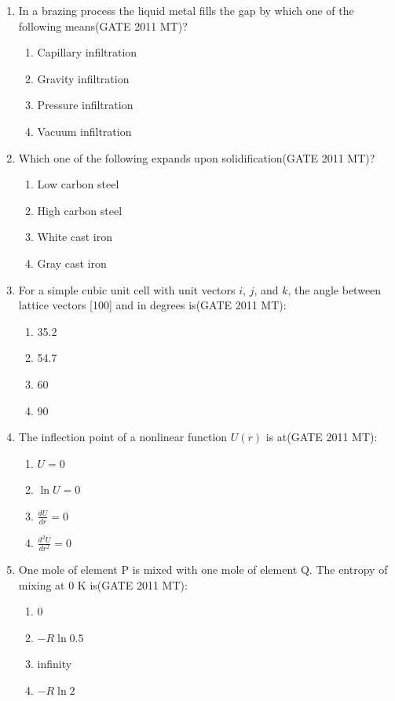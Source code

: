 \documentclass[12pt]{article}
\begin{document}
\begin{enumerate}
\item In a brazing process the liquid metal fills the gap by which one of the following means(GATE 2011 MT)?
    \begin{enumerate}
        \item Capillary infiltration
        \item Gravity infiltration
        \item Pressure infiltration
        \item Vacuum infiltration
    \end{enumerate}

\item Which one of the following expands upon solidification(GATE 2011 MT)?
    \begin{enumerate}
        \item Low carbon steel
        \item High carbon steel
        \item White cast iron
        \item Gray cast iron
    \end{enumerate}

\item For a simple cubic unit cell with unit vectors $i$, $j$, and $k$, the angle between lattice vectors [100] and  in degrees is(GATE 2011 MT):
    \begin{enumerate}
        \item 35.2
        \item 54.7
        \item 60
        \item 90
    \end{enumerate}

\item The inflection point of a nonlinear function $U(r)$ is at(GATE 2011 MT):
    \begin{enumerate}
        \item $U = 0$
        \item $\ln U = 0$
        \item $\frac{dU}{dr} = 0$
        \item $\frac{d^2U}{dr^2} = 0$
    \end{enumerate}

\item One mole of element P is mixed with one mole of element Q. The entropy of mixing at 0 K is(GATE 2011 MT):
    \begin{enumerate}
        \item 0
        \item $-R \ln 0.5$
        \item infinity
        \item $-R \ln 2$
    \end{enumerate}


\end{enumerate}
\end{document}
